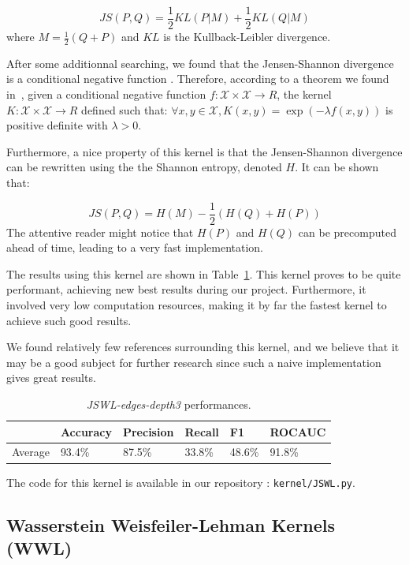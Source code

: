 \documentclass{IEEEtran}
\begin{document}
\begin{equation*}
    JS(P, Q) = \frac{1}{2}KL(P|M) + \frac{1}{2}KL(Q|M)
\end{equation*}
where $M = \frac{1}{2} \left( Q + P \right)$ and $KL$ is the Kullback-Leibler divergence.

After some additionnal searching, we found that the Jensen-Shannon divergence is a conditional negative function \cite{callut2011sequence}.
Therefore, according to a theorem we found in~\cite{callut2011sequence},
given a conditional negative function $ f : \mathcal{X} \times \mathcal{X} \to R$,
the kernel $K : \mathcal{X} \times \mathcal{X} \to R$ defined such that:
$\forall x, y \in \mathcal{X}, K(x, y) = \exp{(- \lambda f(x,y))}$
is positive definite with $\lambda > 0$.

Furthermore, a nice property of this kernel is
that the Jensen-Shannon divergence can be rewritten using the
the Shannon entropy, denoted $H$. It can be shown that:

\begin{equation*}
    JS(P, Q) = H(M) - \frac{1}{2} \left( H(Q) + H(P) \right)
\end{equation*}
The attentive reader might notice that
$H(P)$ and $H(Q)$ can be precomputed ahead of time,
leading to a very fast implementation.

The results using this kernel are shown in Table~\ref{tab:jswl}. This kernel proves to be quite performant, achieving new best results during our project. Furthermore, it involved very low computation resources, making it by far the fastest kernel to achieve such good results.

We found relatively few references surrounding this kernel, and we believe that it may be a good subject for further research since such a naive implementation gives great results.
\begin{table}[h]
    \centering
    \begin{tabular}{l|llll|l}
                & Accuracy & Precision & Recall & F1     & ROCAUC \\
        \hline
        Average & 93.4\%   & 87.5\%    & 33.8\% & 48.6\% & 91.8\% \\
    \end{tabular}
    \caption{\emph{JSWL-edges-depth3} performances.}
    \label{tab:jswl}
\end{table}

The code for this kernel is available in our repository : \texttt{kernel/JSWL.py}.

\subsection{Wasserstein Weisfeiler-Lehman Kernels (WWL)}
\end{document}
